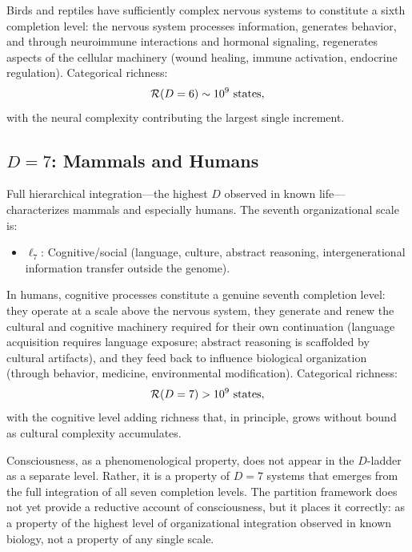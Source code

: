 Birds and reptiles have sufficiently complex nervous systems to constitute
a sixth completion level: the nervous system processes information, generates
behavior, and through neuroimmune interactions and hormonal signaling,
regenerates aspects of the cellular machinery (wound healing, immune
activation, endocrine regulation). Categorical richness:
\begin{equation}
  \mathcal{R}(D=6) \sim 10^9 \text{ states},
  \label{eq:richness_D6}
\end{equation}
with the neural complexity contributing the largest single increment.

\subsection{$D = 7$: Mammals and Humans}

Full hierarchical integration---the highest $D$ observed in known life---
characterizes mammals and especially humans. The seventh organizational scale
is:
\begin{itemize}
  \item $\ell_7$: Cognitive/social (language, culture, abstract reasoning,
        intergenerational information transfer outside the genome).
\end{itemize}

In humans, cognitive processes constitute a genuine seventh completion level:
they operate at a scale above the nervous system, they generate and renew
the cultural and cognitive machinery required for their own continuation
(language acquisition requires language exposure; abstract reasoning is
scaffolded by cultural artifacts), and they feed back to influence biological
organization (through behavior, medicine, environmental modification).
Categorical richness:
\begin{equation}
  \mathcal{R}(D=7) > 10^9 \text{ states},
  \label{eq:richness_D7}
\end{equation}
with the cognitive level adding richness that, in principle, grows without
bound as cultural complexity accumulates.

\begin{remark}[Consciousness]
Consciousness, as a phenomenological property, does not appear in the $D$-ladder
as a separate level. Rather, it is a property of $D = 7$ systems that emerges
from the full integration of all seven completion levels. The partition framework
does not yet provide a reductive account of consciousness, but it places it
correctly: as a property of the highest level of organizational integration
observed in known biology, not a property of any single scale.
\end{remark}

